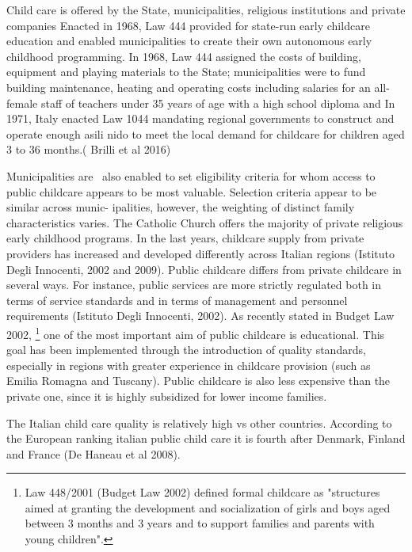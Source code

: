 \documentclass[12pt]{article}
\begin{document}
Child care is offered by the State, municipalities, religious institutions
and private companies Enacted in 1968, Law 444 provided for state-run early
childcare education and enabled municipalities to create their own
autonomous early childhood programming. In 1968, Law 444 assigned the costs
of building, equipment and playing materials to the State; municipalities
were to fund building maintenance, heating and operating costs including
salaries for an all-female staff of teachers under 35 years of age with a
high school diploma and In 1971, Italy enacted Law 1044 mandating regional
governments to construct and operate enough asili nido to meet the local
demand for childcare for children aged 3 to 36 months.( Brilli et al 2016)

Municipalities are \ also enabled to set eligibility criteria for whom
access to public childcare appears to be most valuable. Selection criteria
appear to be similar across munic- ipalities, however, the weighting of
distinct family characteristics varies. The Catholic Church offers the
majority of private religious early childhood programs. In the last years,
childcare supply from private providers has increased and developed
differently across Italian regions (Istituto Degli Innocenti, 2002 and
2009). Public childcare differs from private childcare in several ways. For
instance, public services are more strictly regulated both in terms of
service standards and in terms of management and personnel requirements
(Istituto Degli Innocenti, 2002). As recently stated in Budget Law 2002,%
\footnote{Law 448/2001 (Budget Law 2002) defined formal childcare as "structures aimed at granting the development and socialization of girls and boys aged between 3 months and 3 years and to support families and parents with young children".}
one of the most important aim of public childcare is educational. This goal
has been implemented through the introduction of quality standards,
especially in regions with greater experience in childcare provision (such
as Emilia Romagna and Tuscany). Public childcare is also less expensive than
the private one, since it is highly subsidized for lower income families.

The Italian child care quality is relatively high vs other countries.
According to the European ranking italian public child care it is fourth
after Denmark, Finland and France (De Haneau et al 2008).
\end{document}
